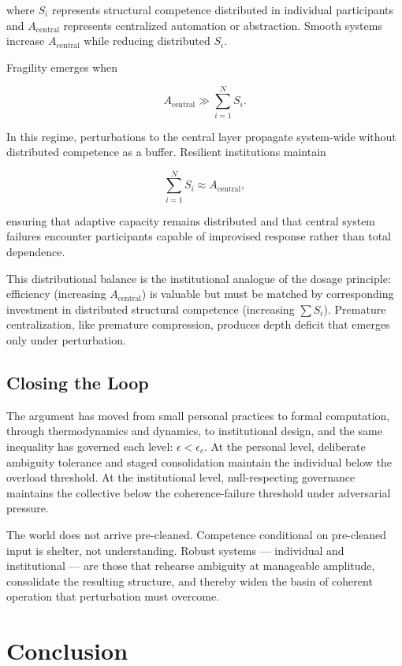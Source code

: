 \documentclass[11pt]{article}
\theoremstyle{remark}
\begin{document}
where $S_i$ represents structural competence distributed in individual participants and $A_{\text{central}}$ represents centralized automation or abstraction. Smooth systems increase $A_{\text{central}}$ while reducing distributed $S_i$.

Fragility emerges when

\[
A_{\text{central}} \gg \sum_{i=1}^N S_i.
\]

In this regime, perturbations to the central layer propagate system-wide without distributed competence as a buffer. Resilient institutions maintain

\[
\sum_{i=1}^N S_i \approx A_{\text{central}},
\]

ensuring that adaptive capacity remains distributed and that central system failures encounter participants capable of improvised response rather than total dependence.

This distributional balance is the institutional analogue of the dosage principle: efficiency (increasing $A_{\text{central}}$) is valuable but must be matched by corresponding investment in distributed structural competence (increasing $\sum S_i$). Premature centralization, like premature compression, produces depth deficit that emerges only under perturbation.

\subsection{Closing the Loop}

The argument has moved from small personal practices to formal computation, through thermodynamics and dynamics, to institutional design, and the same inequality has governed each level: $\epsilon < \epsilon_c$. At the personal level, deliberate ambiguity tolerance and staged consolidation maintain the individual below the overload threshold. At the institutional level, null-respecting governance maintains the collective below the coherence-failure threshold under adversarial pressure.

The world does not arrive pre-cleaned. Competence conditional on pre-cleaned input is shelter, not understanding. Robust systems — individual and institutional — are those that rehearse ambiguity at manageable amplitude, consolidate the resulting structure, and thereby widen the basin of coherent operation that perturbation must overcome.

\section{Conclusion}
\end{document}
